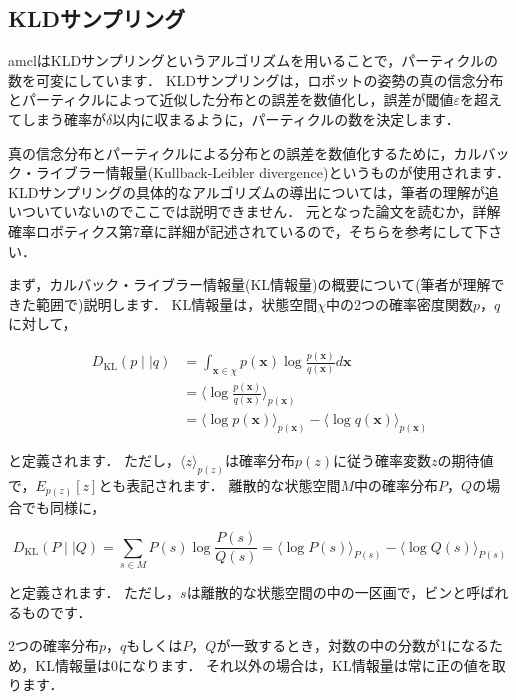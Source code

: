 \documentclass[{../../master}]{subfiles}
\begin{document}
\subsection{KLDサンプリング}

\textsf{amcl}はKLDサンプリング\cite{amcl}というアルゴリズムを用いることで，パーティクルの数を可変にしています．
KLDサンプリングは，ロボットの姿勢の真の信念分布とパーティクルによって近似した分布との誤差を数値化し，誤差が閾値$\varepsilon$を超えてしまう確率が$\delta$以内に収まるように，パーティクルの数を決定します．

真の信念分布とパーティクルによる分布との誤差を数値化するために，カルバック・ライブラー情報量(Kullback-Leibler divergence)というものが使用されます．
KLDサンプリングの具体的なアルゴリズムの導出については，筆者の理解が追いついていないのでここでは説明できません．
元となった論文を読むか，詳解確率ロボティクス\cite{上田2019}第7章に詳細が記述されているので，そちらを参考にして下さい．

まず，カルバック・ライブラー情報量(KL情報量)の概要について(筆者が理解できた範囲で)説明します．
KL情報量は，状態空間$\chi$中の2つの確率密度関数$p$，$q$に対して，

\begin{equation}
  \begin{split}
    D_{\text{KL}}(p \mid\mid q) &= \int_{\bm{x} \in \chi} p(\bm{x}) \log{\frac{p(\bm{x})}{q(\bm{x})}}d\bm{x} \\
    &= \langle \log{\frac{p(\bm{x})}{q(\bm{x})}} \rangle_{p(\bm{x})} \\
    &= \langle \log{p(\bm{x})} \rangle_{p(\bm{x})} - \langle \log{q(\bm{x})} \rangle_{p(\bm{x})}
  \end{split}
\end{equation}

\noindent
と定義されます．
ただし，$\langle z \rangle_{p(z)}$は確率分布$p(z)$に従う確率変数$z$の期待値で，$E_{p(z)}[z]$とも表記されます．
離散的な状態空間$M$中の確率分布$P$，$Q$の場合でも同様に，

\begin{equation}
  D_{\text{KL}}(P \mid\mid Q) = \sum_{s \in M} P(s)\log{\frac{P(s)}{Q(s)}} = \langle \log{P(s)} \rangle_{P(s)} - \langle \log{Q(s)} \rangle_{P(s)}
\end{equation}

\noindent
と定義されます．
ただし，$s$は離散的な状態空間の中の一区画で，ビンと呼ばれるものです．

2つの確率分布$p$，$q$もしくは$P$，$Q$が一致するとき，対数の中の分数が1になるため，KL情報量は0になります．
それ以外の場合は，KL情報量は常に正の値を取ります．
\end{document}
